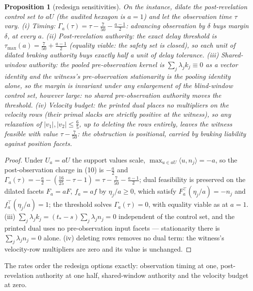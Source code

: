 \documentclass[10pt,twocolumn]{article}
\theoremstyle{plain}
\newtheorem{proposition}[theorem]{Proposition}
\theoremstyle{definition}
\theoremstyle{remark}
\begin{document}
\begin{proposition}[redesign sensitivities]\label{prop:redesign}
On the instance, dilate the post-revelation control set to \(aU\) (the
audited hexagon is \(a = 1\)) and let the observation time \(\tau\)
vary. \emph{(i) Timing:} \(\Gamma_a(\tau) = \tau - \tfrac7{50} -
\tfrac{a-1}{2}\): advancing observation by \(\delta\) buys margin
\(\delta\), at every \(a\). \emph{(ii) Post-revelation authority:}
the exact delay threshold is \(\tau_{\max}(a) = \tfrac7{50} +
\tfrac{a-1}{2}\) (equality viable: the safety set is closed), so each
unit of dilated braking authority buys exactly half a unit of delay
tolerance. \emph{(iii) Shared-window authority:} the pooled
pre-observation kernel is \(\sum_j \lambda_j k_j \equiv 0\) as a
vector identity and the witness's pre-observation stationarity is the
pooling identity alone, so the margin is invariant under \emph{any}
enlargement of the blind-window control set, however large: no shared
pre-observation authority moves the threshold. \emph{(iv) Velocity
budget:} the printed dual places no multipliers on the velocity rows
(their primal slacks are strictly positive at the witness), so any
relaxation of \(|v_1|, |v_2| \le \tfrac65\), up to deleting the rows
entirely, leaves the witness feasible with value \(\tau -
\tfrac7{50}\): the obstruction is positional, carried by braking
liability against position facets.
\end{proposition}

\begin{proof}
Under \(U_a = aU\) the support values scale,
\(\max_{u \in aU}\langle u, n_j \rangle = -a\), so the
post-observation charge in (10) is \(-\tfrac{a}{2}\) and
\(\Gamma_a(\tau) = -\tfrac{a}{2} - (\tfrac{16}{25} - \tau - 1) =
\tau - \tfrac7{50} - \tfrac{a-1}{2}\); dual feasibility is preserved
on the dilated facets \(F_a = aF\), \(f_a = af\) by
\(\eta_j/a \ge 0\), which satisfy \(F_a^\top(\eta_j/a) = -n_j\)
and \(f_a^\top(\eta_j/a) = 1\); the threshold solves
\(\Gamma_a(\tau) = 0\), with equality viable as at \(a = 1\). (iii)
\(\sum_j \lambda_j k_j = (t_* - s)\sum_j \lambda_j n_j = 0\)
independent of the control set, and the printed dual uses no
pre-observation input facets --- stationarity there is
\(\sum_j \lambda_j n_j = 0\) alone. (iv) deleting rows removes no
dual term: the witness's velocity-row multipliers are zero and its value
is unchanged.
\end{proof}

The rates order the redesign options exactly: observation timing at one,
post-revelation authority at one half, shared-window authority and the
velocity budget at zero.
\end{document}
